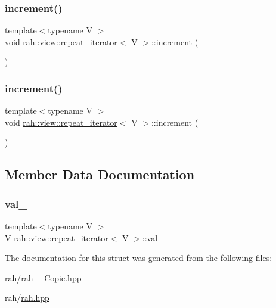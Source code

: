 \subsubsection{\texorpdfstring{increment()}{increment()}\hspace{0.1cm}{\footnotesize\ttfamily [1/2]}}
{\footnotesize\ttfamily template$<$typename V $>$ \\
void \mbox{\hyperlink{structrah_1_1view_1_1repeat__iterator}{rah\+::view\+::repeat\+\_\+iterator}}$<$ V $>$\+::increment (\begin{DoxyParamCaption}{ }\end{DoxyParamCaption})\hspace{0.3cm}{\ttfamily [inline]}}

\mbox{\label{structrah_1_1view_1_1repeat__iterator_a5556f69de4c759f4fec42c12d70ea869}} 
\subsubsection{\texorpdfstring{increment()}{increment()}\hspace{0.1cm}{\footnotesize\ttfamily [2/2]}}
{\footnotesize\ttfamily template$<$typename V $>$ \\
void \mbox{\hyperlink{structrah_1_1view_1_1repeat__iterator}{rah\+::view\+::repeat\+\_\+iterator}}$<$ V $>$\+::increment (\begin{DoxyParamCaption}{ }\end{DoxyParamCaption})\hspace{0.3cm}{\ttfamily [inline]}}



\subsection{Member Data Documentation}
\mbox{\label{structrah_1_1view_1_1repeat__iterator_a6286ca38cb848630cb870dc6ab42eb79}} 
\subsubsection{\texorpdfstring{val\_}{val\_}}
{\footnotesize\ttfamily template$<$typename V $>$ \\
V \mbox{\hyperlink{structrah_1_1view_1_1repeat__iterator}{rah\+::view\+::repeat\+\_\+iterator}}$<$ V $>$\+::val\+\_\+}



The documentation for this struct was generated from the following files\+:\begin{DoxyCompactItemize}
\item 
rah/\mbox{\hyperlink{rah_01-_01_copie_8hpp}{rah -\/ Copie.\+hpp}}\item 
rah/\mbox{\hyperlink{rah_8hpp}{rah.\+hpp}}\end{DoxyCompactItemize}
